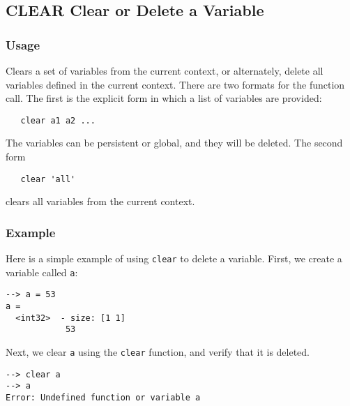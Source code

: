 %
%
%
\subsection{CLEAR Clear or Delete a Variable}
\subsubsection{Usage}
Clears a set of variables from the current context, or alternately, 
delete all variables defined in the current context.  There are
two formats for the function call.  The first is the explicit form
in which a list of variables are provided:
\begin{verbatim}
   clear a1 a2 ...
\end{verbatim}
The variables can be persistent or global, and they will be deleted.
The second form
\begin{verbatim}
   clear 'all'
\end{verbatim}
clears all variables from the current context.
\subsubsection{Example}
Here is a simple example of using \verb|clear| to delete a variable.  First, we create a variable called \verb|a|:
\begin{verbatim}
--> a = 53
a =
  <int32>  - size: [1 1]
            53  
\end{verbatim}
Next, we clear \verb|a| using the \verb|clear| function, and verify that it is deleted.
\begin{verbatim}
--> clear a
--> a
Error: Undefined function or variable a
\end{verbatim}

